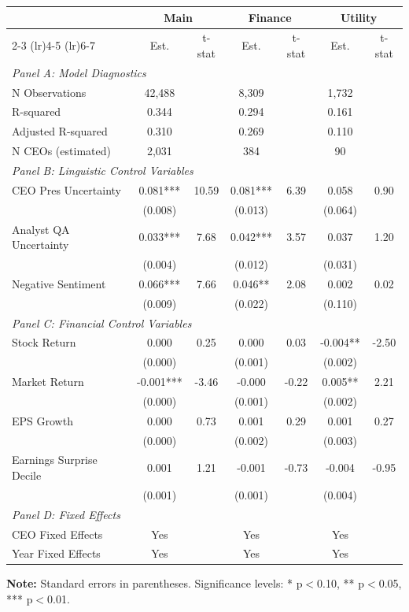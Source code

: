 \begin{table}[htbp]
\begin{tabular}{@{}lcccccc@{}}
\toprule
 & \multicolumn{2}{c}{Main} & \multicolumn{2}{c}{Finance} & \multicolumn{2}{c}{Utility} \\
\cmidrule(lr){2-3} \cmidrule(lr){4-5} \cmidrule(lr){6-7}
 & Est. & t-stat & Est. & t-stat & Est. & t-stat \\
\midrule
\multicolumn{7}{l}{\textit{Panel A: Model Diagnostics}} \\
\midrule
N Observations & 42,488 &  & 8,309 &  & 1,732 &  \\
R-squared & 0.344 &  & 0.294 &  & 0.161 &  \\
Adjusted R-squared & 0.310 &  & 0.269 &  & 0.110 &  \\
N CEOs (estimated) & 2,031 &  & 384 &  & 90 &  \\
\midrule
\multicolumn{7}{l}{\textit{Panel B: Linguistic Control Variables}} \\
\midrule
CEO Pres Uncertainty & 0.081*** & 10.59 & 0.081*** & 6.39 & 0.058 & 0.90 \\
 & (0.008) &  & (0.013) &  & (0.064) &  \\
Analyst QA Uncertainty & 0.033*** & 7.68 & 0.042*** & 3.57 & 0.037 & 1.20 \\
 & (0.004) &  & (0.012) &  & (0.031) &  \\
Negative Sentiment & 0.066*** & 7.66 & 0.046** & 2.08 & 0.002 & 0.02 \\
 & (0.009) &  & (0.022) &  & (0.110) &  \\
\midrule
\multicolumn{7}{l}{\textit{Panel C: Financial Control Variables}} \\
\midrule
Stock Return & 0.000 & 0.25 & 0.000 & 0.03 & -0.004** & -2.50 \\
 & (0.000) &  & (0.001) &  & (0.002) &  \\
Market Return & -0.001*** & -3.46 & -0.000 & -0.22 & 0.005** & 2.21 \\
 & (0.000) &  & (0.001) &  & (0.002) &  \\
EPS Growth & 0.000 & 0.73 & 0.001 & 0.29 & 0.001 & 0.27 \\
 & (0.000) &  & (0.002) &  & (0.003) &  \\
Earnings Surprise Decile & 0.001 & 1.21 & -0.001 & -0.73 & -0.004 & -0.95 \\
 & (0.001) &  & (0.001) &  & (0.004) &  \\
\midrule
\multicolumn{7}{l}{\textit{Panel D: Fixed Effects}} \\
\midrule
CEO Fixed Effects & Yes &  & Yes &  & Yes &  \\
Year Fixed Effects & Yes &  & Yes &  & Yes &  \\
\bottomrule
\end{tabular}

\vspace{0.5em}
{\footnotesize \textbf{Note:} Standard errors in parentheses. Significance levels: * p$<$0.10, ** p$<$0.05, *** p$<$0.01.}

\end{table}

